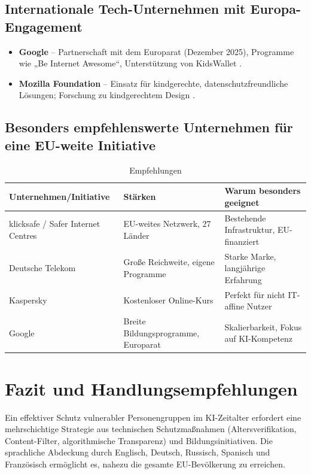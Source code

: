 \documentclass[11pt,a4paper]{article}
\begin{document}
	\subsection{Internationale Tech-Unternehmen mit Europa-Engagement}
	\begin{itemize}
		\item \textbf{Google} -- Partnerschaft mit dem Europarat (Dezember 2025), Programme wie „Be Internet Awesome“, Unterstützung von KidsWallet \cite{coe2025}.
		\item \textbf{Mozilla Foundation} -- Einsatz für kindgerechte, datenschutzfreundliche Lösungen; Forschung zu kindgerechtem Design \cite{mozilla2026}.
	\end{itemize}
	
	\subsection{Besonders empfehlenswerte Unternehmen für eine EU-weite Initiative}
	\begin{table}[ht]
		\centering
		\caption{Empfehlungen}
		\begin{tabularx}{\linewidth}{@{}lXX@{}}
			\toprule
			Unternehmen/Initiative & Stärken & Warum besonders geeignet \\
			\midrule
			klicksafe / Safer Internet Centres & EU-weites Netzwerk, 27 Länder & Bestehende Infrastruktur, EU-finanziert \\
			Deutsche Telekom & Große Reichweite, eigene Programme & Starke Marke, langjährige Erfahrung \\
			Kaspersky & Kostenloser Online-Kurs & Perfekt für nicht IT-affine Nutzer \\
			Google & Breite Bildungsprogramme, Europarat & Skalierbarkeit, Fokus auf KI-Kompetenz \\
			\bottomrule
		\end{tabularx}
	\end{table}
	
	\section{Fazit und Handlungsempfehlungen}
	Ein effektiver Schutz vulnerabler Personengruppen im KI-Zeitalter erfordert eine mehrschichtige Strategie aus technischen Schutzmaßnahmen (Altersverifikation, Content-Filter, algorithmische Transparenz) und Bildungsinitiativen. Die sprachliche Abdeckung durch Englisch, Deutsch, Russisch, Spanisch und Französisch ermöglicht es, nahezu die gesamte EU-Bevölkerung zu erreichen.
	
\end{document}
